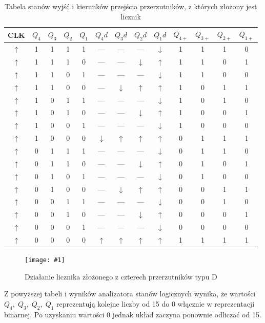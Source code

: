 \documentclass{article}
\newcommand{\image}[3]{
    \begin{figure}[H]
        \centering
        \captionsetup{font=small, skip=2pt}
        \texttt{[image: \#1]}
        \caption{#2}
    \end{figure}
}
\begin{document}
    \begin{table}[H]
        \centering
        \captionsetup{font=small, skip=2pt}
        \caption{Tabela stanów wyjść i kierunków przejścia przerzutników, z których złożony jest licznik}
        \begin{tabular}{|c|c|c|c|c|c|c|c|c|c|c|c|c|}
            \hline
            CLK & \(Q_4\) & \(Q_3\) & \(Q_2\) & \(Q_1\) & \(Q_4d\) & \(Q_3d\) & \(Q_2d\) & \(Q_1d\) & \(Q_{4+}\) & \(Q_{3+}\) & \(Q_{2+}\) & \(Q_{1+}\)\\
            \hline
            \(\uparrow\) & 1 & 1 & 1 & 1 & --- & --- & --- & \(\downarrow\) & 1 & 1 & 1 & 0\\
            \(\uparrow\) & 1 & 1 & 1 & 0 & --- & --- & \(\downarrow\) & \(\uparrow\) & 1 & 1 & 0 & 1\\
            \(\uparrow\) & 1 & 1 & 0 & 1 & --- & --- & --- & \(\downarrow\) & 1 & 1 & 0 & 0\\
            \(\uparrow\) & 1 & 1 & 0 & 0 & --- & \(\downarrow\) & \(\uparrow\) & \(\uparrow\) & 1 & 0 & 1 & 1\\
            \(\uparrow\) & 1 & 0 & 1 & 1 & --- & --- & --- & \(\downarrow\) & 1 & 0 & 1 & 0 \\
            \(\uparrow\) & 1 & 0 & 1 & 0 & --- & --- & \(\downarrow\) & \(\uparrow\) & 1 & 0 & 0 & 1\\
            \(\uparrow\) & 1 & 0 & 0 & 1 & --- & --- & --- & \(\downarrow\) & 1 & 0 & 0 & 0\\
            \(\uparrow\) & 1 & 0 & 0 & 0 & \(\downarrow\) & \(\uparrow\) & \(\uparrow\) & \(\uparrow\) & 0 & 1 & 1 & 1\\
            \(\uparrow\) & 0 & 1 & 1 & 1 & --- & --- & --- & \(\downarrow\) & 0 & 1 & 1 & 0\\
            \(\uparrow\) & 0 & 1 & 1 & 0 & --- & --- & \(\downarrow\) & \(\uparrow\) & 0 & 1 & 0 & 1\\
            \(\uparrow\) & 0 & 1 & 0 & 1 & --- & --- & --- & \(\downarrow\) & 0 & 1 & 0 & 0\\
            \(\uparrow\) & 0 & 1 & 0 & 0 & --- & \(\downarrow\) & \(\uparrow\) & \(\uparrow\) & 0 & 0 & 1 & 1\\
            \(\uparrow\) & 0 & 0 & 1 & 1 & --- & --- & --- & \(\downarrow\) & 0 & 0 & 1 & 0\\
            \(\uparrow\) & 0 & 0 & 1 & 0 & --- & --- & \(\downarrow\) & \(\uparrow\) & 0 & 0 & 0 & 1\\
            \(\uparrow\) & 0 & 0 & 0 & 1 & --- & --- & --- & \(\downarrow\) & 0 & 0 & 0 & 0\\
            \(\uparrow\) & 0 & 0 & 0 & 0 & \(\uparrow\) & \(\uparrow\) & \(\uparrow\) & \(\uparrow\) & 1 & 1 & 1 & 1\\
            \hline
        \end{tabular}
    \end{table}
    \image{images/licznik_analizator}{Działanie licznika złożonego z czterech przerzutników typu D}{scale=0.5}
    Z powyższej tabeli i wyników analizatora stanów logicznych wynika, że wartości \(Q_4,\;Q_3,\;Q_2,\;Q_1\)
    reprezentują kolejne liczby od 15 do 0 włącznie w reprezentacji binarnej. Po uzyskaniu wartości 0 jednak układ zaczyna
    ponownie odliczać od 15.
\end{document}
